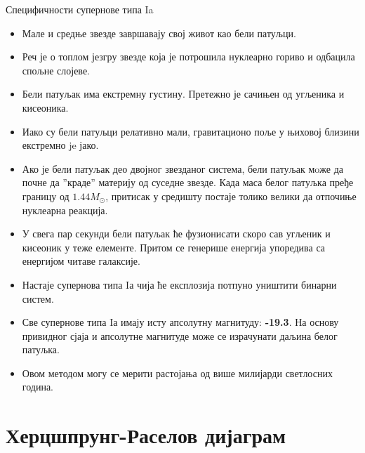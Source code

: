 \documentclass[aspectratio=169, xcolor=table, 10pt]{beamer}
\begin{document}
\begin{frame}{Специфичности супернове типа Ia}
  \begin{itemize}
    \item Мале и средње звезде завршавају свој живот као бели патуљци.
    \item Реч је о топлом језгру звезде која је потрошила нуклеарно гориво и одбацила спољне слојеве.
    \item Бели патуљак има екстремну густину. Претежно је сачињен од угљеника и кисеоника.
    \item Иако су бели патуљци релативно мали, гравитационо поље у њиховој близини екстремно je јако.
    \item Ако је бели патуљак део двојног звезданог система, бели патуљак мoже да почне да ”краде” материју од суседне звезде. Када маса белог патуљка пређе границу од $1.44 M_{\odot}$, притисак у средишту постаје толико велики да отпочиње нуклеарна реакција.
    \item У свега пар секунди бели патуљак ће фузионисати скоро сав угљеник и кисеоник у теже елементе. Притом се генерише енергија упоредива са енергијом читаве галаксије.
    \item Настаје супернова типа Iа чија ће експлозија потпуно уништити бинарни систем.
    \item Све супернове типа Iа имају исту апсолутну магнитуду: \textbf{-19.3}. На основу привидног сјаја и апсолутне магнитуде може се израчунати даљина белог патуљка.
    \item Овом методом могу се мерити растојања од више милијарди светлосних година.
  \end{itemize}
\end{frame}

\section{Херцшпрунг-Раселов дијаграм}
\end{document}
